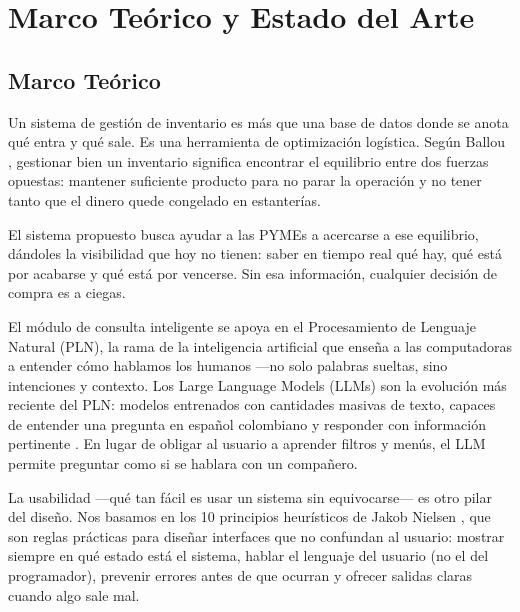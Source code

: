 

\section{Marco Teórico y Estado del Arte}

\subsection{Marco Teórico}

Un sistema de gestión de inventario es más que una base de datos donde se anota qué entra y qué sale. Es una herramienta de optimización logística. Según Ballou \cite{ballou2004logistica}, gestionar bien un inventario significa encontrar el equilibrio entre dos fuerzas opuestas: mantener suficiente producto para no parar la operación y no tener tanto que el dinero quede congelado en estanterías.

El sistema propuesto busca ayudar a las PYMEs a acercarse a ese equilibrio, dándoles la visibilidad que hoy no tienen: saber en tiempo real qué hay, qué está por acabarse y qué está por vencerse. Sin esa información, cualquier decisión de compra es a ciegas.

El módulo de consulta inteligente se apoya en el Procesamiento de Lenguaje Natural (PLN), la rama de la inteligencia artificial que enseña a las computadoras a entender cómo hablamos los humanos ---no solo palabras sueltas, sino intenciones y contexto. Los Large Language Models (LLMs) son la evolución más reciente del PLN: modelos entrenados con cantidades masivas de texto, capaces de entender una pregunta en español colombiano y responder con información pertinente \cite{zhao2023surveyllm}. En lugar de obligar al usuario a aprender filtros y menús, el LLM permite preguntar como si se hablara con un compañero.

La usabilidad ---qué tan fácil es usar un sistema sin equivocarse--- es otro pilar del diseño. Nos basamos en los 10 principios heurísticos de Jakob Nielsen \cite{nielsen1994heuristics}, que son reglas prácticas para diseñar interfaces que no confundan al usuario: mostrar siempre en qué estado está el sistema, hablar el lenguaje del usuario (no el del programador), prevenir errores antes de que ocurran y ofrecer salidas claras cuando algo sale mal.


